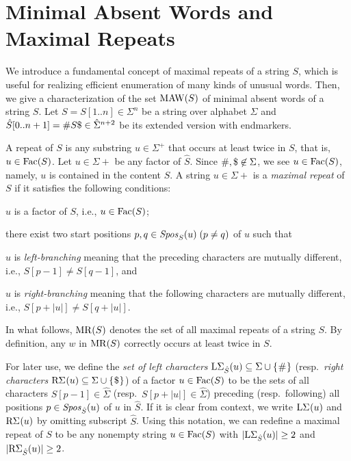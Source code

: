 \section{Minimal Absent Words and Maximal Repeats}

We introduce a fundamental concept of maximal repeats of a string $S$, which is useful for realizing efficient enumeration of many kinds of unusual words. Then, we give a characterization of the set $\MAW(S)$ of minimal absent words of a string $S$. 
Let $S = S[1..n] \in \Sigma^n$ be a string over alphabet $\Sigma$ and $\hat S[0..n+1] = \# S\daller \in \hat\Sigma^{n+2}$ be its extended version with endmarkers.

A repeat of $S$ is any substring $u \in \Sigma^+$ that occurs at least twice in $S$, that is, $u \in \Fac(S)$.
Let $u \in \Sigma+$ be any factor of $\hat S$. Since $\#, \daller \not\in \Sigma$, we see $u \in \Fac(S)$, namely, $u$ is contained in the content $S$.
A string $u \in \Sigma+$ is a \textit{maximal repeat} of $S$ if it satisfies the following conditions: 
\begin{enumerate*}[(1)]
\item $u$ is a factor of $S$, i.e., $u \in \Fac(S)$;  
\item there exist two start positions $p, q \in \Spos[S](u)\;(p\not= q)$ of $u$ such that
  \begin{enumerate*}[(i)]
  \item $u$ is \textit{left-branching} meaning that the preceding characters are mutually different, i.e., $S[p-1] \not= S[q-1]$, and
  \item $u$ is \textit{right-branching} meaning that the following characters are mutually different, i.e., $S[p+|u|] \not= S[q+|u|]$. 
  \end{enumerate*}
\end{enumerate*}
In what follows, $\MR(S)$ denotes the set of all maximal repeats of a string $S$. By definition, any $w$ in $\MR(S)$ correctly occurs at least twice in $S$. 

For later use, we define the \textit{set of left characters} $\LSigma(u) \subseteq \Sigma\cup\set{\#}$ (resp.~\textit{right characters} $\RSigma[](u) \subseteq \Sigma\cup\set{\daller}$) of a factor $u \in \Fac(S)$ to be the sets of all characters $S[p-1] \in \hat\Sigma$ (resp.~$S[p+|u|] \in \hat\Sigma$) preceding (resp.~following) all positions $p\in \Spos(u)$ of $u$ in $\hat S$.
If it is clear from context, we write $\LSigma[](u)$ and $\RSigma[](u)$ by omitting subscript $\hat S$. 
Using this notation, we can redefine a maximal repeat of $S$ to be any nonempty string $u \in \Fac(S)$ with $|\LSigma(u)| \ge 2$ and $|\RSigma(u)| \ge 2$.


